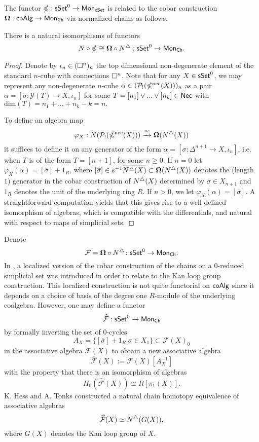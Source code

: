 The functor $\mathbb{\Omega}: \mathsf{sSet}^0 \to \mathsf{Mon}_{\mathsf{cSet}}$ is related to the cobar construction $\mathbf{\Omega}: \mathsf{coAlg} \to \mathsf{Mon}_{\mathsf{Ch}}$ via normalized chains as follows.

\begin{proposition} \label{gcobarandcobar}
There is a natural isomorphisms of functors 
$$N \circ \mathbb{\Omega} \cong \mathbf{\Omega} \circ N^{\triangle}: \mathsf{sSet}^0 \to \mathsf{Mon}_{\mathsf{Ch}}.$$
\end{proposition}

\begin{proof} 
Denote by $\iota_n \in (\square^n)_n$ the top dimensional non-degenerate element of the standard $n$-cube with connections $\square^n$. Note that for any $X \in \mathsf{sSet}^0$, we may represent any non-degenerate $n$-cube $\alpha \in (\mathcal{P}_!(\mathbb{\Omega}^{\text{nec}}(X)))_n$ as a pair $\alpha=[\sigma: \mathcal{Y}(T) \to X, \iota_n]$ for some $T=[n_1] \vee ... \vee [n_k] \in \mathsf{Nec}$ with $\text{dim}(T)=n_1+ ...+n_k-k=n.$

To define an algebra map
$$\varphi_X: N(\mathcal{P}_!(\mathbb{\Omega}^{\text{nec}}(X))) \xrightarrow{\cong} \mathbf{\Omega}(N^{\triangle}(X))$$
it suffices to define it on any generator of the form $\alpha=[\sigma \colon \Delta^{n+1} \to X, \iota_{n}]$, i.e. when $T$ is of the form $T=[n+1]$, for some $n\geq0$. If $n=0$ let $\varphi_X(\alpha)= [\overline{\sigma}]+ 1_R$, where $[\overline{\sigma}] \in s^{-1} \overline{ N^{\triangle}(X)} \subset \mathbf{\Omega}(N^{\triangle}(X))$ denotes the (length $1$) generator in the cobar construction of $N^{\triangle}(X)$ determined by $\sigma \in X_{n+1}$ and $1_R$ denotes the unit of the underlying ring $R$. If $n>0$, we let $\varphi_X(\alpha)=[\overline{\sigma}]$. A straightforward computation yields that this gives rise to a well defined isomorphism of algebras, which is compatible with the differentials, and natural with respect to maps of simplicial sets.  
\end{proof}
Denote $$\mathcal{F}= \mathbf{\Omega} \circ N^{\triangle} \colon \mathsf{sSet}^0 \to \mathsf{Mon}_{\mathsf{Ch}}.$$ In \cite{Hess-Tonks}, a localized version of the cobar construction of the chains on a $0$-reduced simplicial set was introduced in order to relate to the Kan loop group construction. This localized construction is not quite functorial on $\mathsf{coAlg}$ since it depends on a choice of basis of the degree one $R$-module of the underlying coalgebra. However, one may define a functor $$\widehat{\mathcal{F}}: \mathsf{sSet}^0 \to \mathsf{Mon}_{\mathsf{Ch}}$$
by formally inverting the set of $0$-cycles $$A_X=\{ [\overline{\sigma}]+1_R | \sigma \in X_1 \} \subset \mathcal{F}(X)_0$$ in the associative algebra $\mathcal{F}(X)$ to obtain a new associative algebra
$$\widehat{\mathcal{F}}(X):= \mathcal{F}(X)[A_X^{-1}]$$
with the property that there is an isomorphism of algebras $$H_0(\widehat{\mathcal{F}}(X)) \cong R[\pi_1(X)].$$
K. Hess and A. Tonks constructed a natural chain homotopy equivalence of associative algebras $$\widehat{\mathcal{F}}(X)\simeq N^{\triangle}(G(X)),$$ where $G(X)$ denotes the Kan loop group of $X$. 

